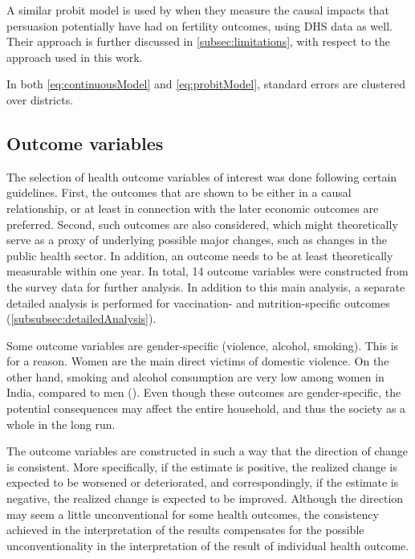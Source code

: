 \documentclass[12pt,a4paper,notitlepage]{article}
\begin{document}
A similar probit model is used by \citet{Bassi:2017} when they measure the causal impacts that persuasion potentially have had on fertility outcomes, using DHS data as well. Their approach is further discussed in \cref{subsec:limitations}, with respect to the approach used in this work.

In both \cref{eq:continuousModel} and \cref{eq:probitModel}, standard errors are clustered over districts.

\subsection{Outcome variables} \label{subsec:outcomeVariables}

The selection of health outcome variables of interest was done following certain guidelines. First, the outcomes that are shown to be either in a causal relationship, or at least in connection with the later economic outcomes are preferred. Second, such outcomes are also considered, which might theoretically serve as a proxy of underlying possible major changes, such as changes in the public health sector. In addition, an outcome needs to be at least theoretically measurable within one year. In total, 14 outcome variables were constructed from the survey data for further analysis. In addition to this main analysis, a separate detailed analysis is performed for vaccination- and nutrition-specific outcomes (\cref{subsubsec:detailedAnalysis}).

Some outcome variables are gender-specific (violence, alcohol, smoking). This is for a reason. Women are the main direct victims of domestic violence. On the other hand, smoking and alcohol consumption are very low among women in India, compared to men (\citet{iips2021}). Even though these outcomes are gender-specific, the potential consequences may affect the entire household, and thus the society as a whole in the long run.

The outcome variables are constructed in such a way that the direction of change is consistent. More specifically, if the estimate is positive, the realized change is expected to be worsened or deteriorated, and correspondingly, if the estimate is negative, the realized change is expected to be improved. Although the direction may seem a little unconventional for some health outcomes, the consistency achieved in the interpretation of the results compensates for the possible unconventionality in the interpretation of the result of individual health outcome.
\end{document}
